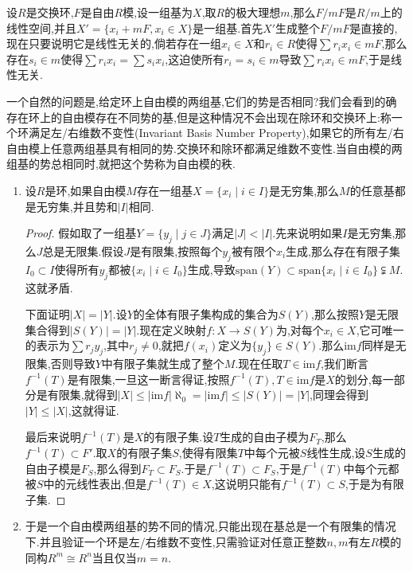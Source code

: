 设$R$是交换环,$F$是自由$R$模,设一组基为$X$,取$R$的极大理想$m$,那么$F/mF$是$R/m$上的线性空间,并且$X'=\{x_i+mF,x_i\in X\}$是一组基.首先$X'$生成整个$F/mF$是直接的,现在只要说明它是线性无关的,倘若存在一组$x_i\in X$和$r_i\in R$使得$\sum r_ix_i\in mF$,那么存在$s_i\in m$使得$\sum r_ix_i=\sum s_ix_i$,这迫使所有$r_i=s_i\in m$导致$\sum r_ix_i\in mF$,于是线性无关.

一个自然的问题是,给定环上自由模的两组基,它们的势是否相同?我们会看到的确存在环上的自由模存在不同势的基,但是这种情况不会出现在除环和交换环上:称一个环满足左/右维数不变性(Invariant Basis Number Property),如果它的所有左/右自由模上任意两组基具有相同的势.交换环和除环都满足维数不变性.当自由模的两组基的势总相同时,就把这个势称为自由模的秩.
\begin{enumerate}
	\item 设$R$是环,如果自由模$M$存在一组基$X=\{x_i\mid i\in I\}$是无穷集,那么$M$的任意基都是无穷集,并且势和$|I|$相同.
	\begin{proof}
		
		假如取了一组基$Y=\{y_j\mid j\in J\}$满足$|J|<|I|$.先来说明如果$I$是无穷集,那么$J$总是无限集.假设$J$是有限集,按照每个$y_j$被有限个$x_i$生成,那么存在有限子集$I_0\subset I$使得所有$y_j$都被$\{x_i\mid i\in I_0\}$生成,导致$\mathrm{span}(Y)\subset\mathrm{span}\{x_i\mid i\in I_0\}\subsetneqq M$.这就矛盾.
		
		下面证明$|X|=|Y|$.设$Y$的全体有限子集构成的集合为$S(Y)$,那么按照$Y$是无限集合得到$|S(Y)|=|Y|$.现在定义映射$f:X\to S(Y)$为,对每个$x_i\in X$,它可唯一的表示为$\sum r_jy_j$,其中$r_j\not=0$,就把$f(x_i)$定义为$\{y_j\}\in S(Y)$.那么$\mathrm{im}f$同样是无限集,否则导致$Y$中有限子集就生成了整个$M$.现在任取$T\in\mathrm{im}f$,我们断言$f^{-1}(T)$是有限集,一旦这一断言得证,按照$f^{-1}(T),T\in\mathrm{im}f$是$X$的划分,每一部分是有限集,就得到$|X|\le|\mathrm{im}f|\aleph_0=|\mathrm{im}f|\le|S(Y)|=|Y|$,同理会得到$|Y|\le|X|$,这就得证.
		
		最后来说明$f^{-1}(T)$是$X$的有限子集.设$T$生成的自由子模为$F_T$,那么$f^{-1}(T)\subset F'$.取$X$的有限子集$S$,使得有限集$T$中每个元被$S$线性生成,设$S$生成的自由子模是$F_S$,那么得到$F_T\subset F_S$.于是$f^{-1}(T)\subset F_S$,于是$f^{-1}(T)$中每个元都被$S$中的元线性表出,但是$f^{-1}(T)\in X$,这说明只能有$f^{-1}(T)\subset S$,于是为有限子集.
	\end{proof}
	\item 于是一个自由模两组基的势不同的情况,只能出现在基总是一个有限集的情况下.并且验证一个环是左/右维数不变性,只需验证对任意正整数$n,m$有左$R$模的同构$R^m\cong R^n$当且仅当$m=n$.
	

\end{enumerate}
